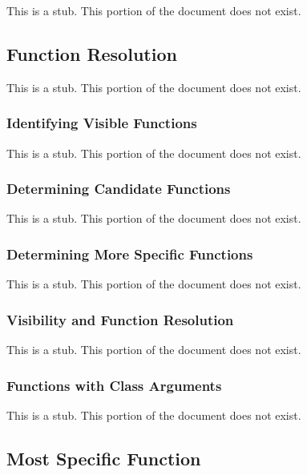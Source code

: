 This is a stub.  This portion of the document does not exist.

\subsection{Function Resolution}
\label{Function_Resolution}

This is a stub.  This portion of the document does not exist.

\subsubsection{Identifying Visible Functions}
\label{Identifying_Visible_Functions}

This is a stub.  This portion of the document does not exist.

\subsubsection{Determining Candidate Functions}
\label{Determining_Candidate_Functions}

This is a stub.  This portion of the document does not exist.

\subsubsection{Determining More Specific Functions}
\label{Determining_More_Specific_Functions}

This is a stub.  This portion of the document does not exist.

\subsubsection{Visibility and Function Resolution}
\label{Visibility_and_Function_Resolution}

This is a stub.  This portion of the document does not exist.

\subsubsection{Functions with Class Arguments}
\label{Functions_with_Class_Arguments}

This is a stub.  This portion of the document does not exist.

\subsection{Most Specific Function}
\label{Most_Specific_Function}

